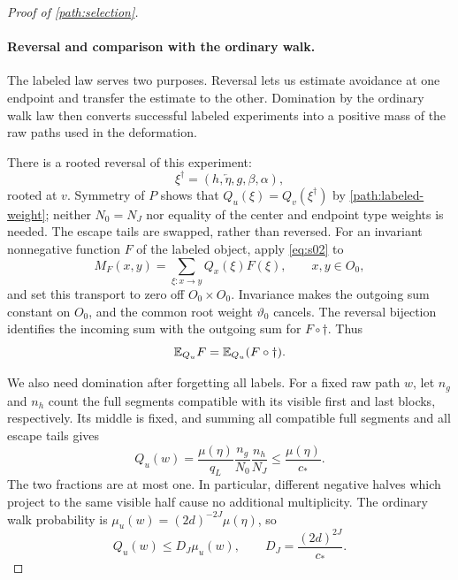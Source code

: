 \begin{proof}[Proof of \cref{path:selection}]
\paragraph{Reversal and comparison with the ordinary walk.}
The labeled law serves two purposes. Reversal lets us estimate avoidance
at one endpoint and transfer the estimate to the other. Domination by
the ordinary walk law then converts successful labeled experiments into
a positive mass of the raw paths used in the deformation.

There is a rooted reversal of this experiment:
\[
 \xi^\dagger=(h,\overleftarrow\eta,g,\beta,\alpha),
\]
rooted at $v$. Symmetry of $P$ shows that
$Q_u(\xi)=Q_v(\xi^\dagger)$ by \eqref{path:labeled-weight}; neither
$N_0=N_J$ nor equality of the center and endpoint type weights is
needed. The escape tails are swapped, rather than reversed. For an
invariant nonnegative function $F$ of the labeled object, apply
\eqref{eq:s02} to
\[
 M_F(x,y)=\sum_{\xi:x\to y}Q_x(\xi)F(\xi),
 \qquad x,y\in O_0,
\]
and set this transport to zero off $O_0\times O_0$. Invariance makes
the outgoing sum constant on $O_0$, and the common root weight
$\vartheta_0$ cancels. The reversal bijection identifies the incoming
sum with the outgoing sum for $F\circ\dagger$. Thus
\begin{equation}
 \mathbb E_{Q_u}F=\mathbb E_{Q_u}(F\circ\dagger).
 \label{path:rooted-reversal}
\end{equation}

We also need domination after forgetting all labels. For a fixed raw
path $w$, let $n_g$ and $n_h$ count the full segments compatible with
its visible first and last blocks, respectively. Its middle is fixed,
and summing all compatible full segments and all escape tails gives
\[
 Q_u(w)=\frac{\mu(\eta)}{q_L}
        \frac{n_g}{N_0}\frac{n_h}{N_J}
 \le \frac{\mu(\eta)}{c_*}.
\]
The two fractions are at most one. In particular, different negative
halves which project to the same visible half cause no additional
multiplicity. The ordinary walk probability is
$\mu_u(w)=(2d)^{-2J}\mu(\eta)$, so
\begin{equation}
 Q_u(w)\le D_J\mu_u(w),\qquad
 D_J=\frac{(2d)^{2J}}{c_*}.
 \label{path:domination}
\end{equation}


\end{proof}
